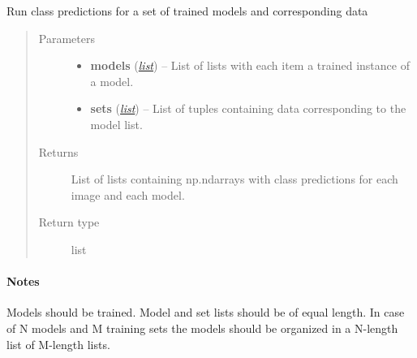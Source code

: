 \documentclass[letterpaper,10pt,english]{sphinxmanual}
\begin{document}
\begin{fulllineitems}
\label{classification:flamingo.classification.models.predict_models}
Run class predictions for a set of trained models and corresponding data
\begin{quote}\begin{description}
\item[{Parameters}] \leavevmode\begin{itemize}
\item {} 
\textbf{models} (\href{http://docs.python.org/library/functions.html\#list}{\emph{list}}) -- List of lists with each item a trained instance of a model.

\item {} 
\textbf{sets} (\href{http://docs.python.org/library/functions.html\#list}{\emph{list}}) -- List of tuples containing data corresponding to the model list.

\end{itemize}

\item[{Returns}] \leavevmode
List of lists containing np.ndarrays with class predictions for each
image and each model.

\item[{Return type}] \leavevmode
list

\end{description}\end{quote}
\paragraph{Notes}

Models should be trained.
Model and set lists should be of equal length.
In case of N models and M training sets the models should be
organized in a N-length list of M-length lists.

\end{fulllineitems}

\end{document}
